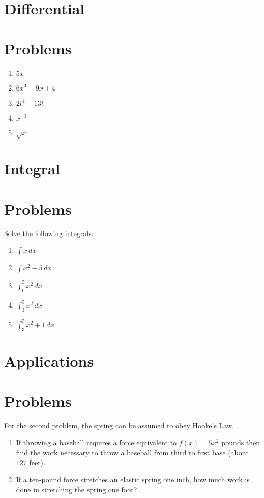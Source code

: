 \documentclass{memoir}
\begin{document}
\section{Differential}


\section{Problems}
\begin{enumerate}
    \item $5x$
    \item $6x^3 - 9x + 4$
    \item $2t^4 - 13t$
    \item $x^{-1}$
    \item $\sqrt{x}$
\end{enumerate}

\section{Integral}


\section{Problems}
Solve the following integrals:

\begin{enumerate}
    \item $\int x \, dx$
    \item $\int x^2-5 \, dx$
    \item $\int^5_0 x^2 \, dx$
    \item $\int^5_3 x^2 \, dx$
    \item $\int^5_3 x^2 + 1 \, dx$
\end{enumerate}

\section{Applications}


\section{Problems}
For the second problem, the spring can be assumed to obey Hooke's Law.

\begin{enumerate}
    \item If throwing a baseball requires a force equivalent to $f(x) = 5x^2$ pounds then find the work necessary to throw a baseball from third to first base (about $127$ feet).
    \item If a ten-pound force stretches an elastic spring one inch, how much work is done in stretching the spring one foot?
\end{enumerate}
\end{document}
